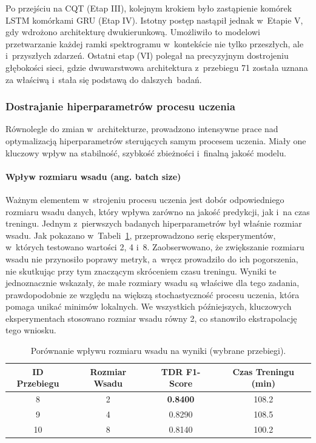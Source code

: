 Po przejściu na CQT (Etap III), kolejnym krokiem było zastąpienie komórek LSTM komórkami GRU (Etap IV). Istotny postęp nastąpił jednak w~Etapie V, gdy wdrożono architekturę dwukierunkową. Umożliwiło to modelowi przetwarzanie każdej ramki spektrogramu w~kontekście nie tylko przeszłych, ale i~przyszłych zdarzeń. Ostatni etap (VI) polegał na precyzyjnym dostrojeniu głębokości sieci, gdzie dwuwarstwowa architektura z~przebiegu 71 została uznana za właściwą i~stała się podstawą do dalszych~badań.

\subsubsection{Dostrajanie hiperparametrów procesu uczenia}
\label{sssec:dostrajanie_hiperparametrow}

Równolegle do zmian w~architekturze, prowadzono intensywne prace nad optymalizacją hiperparametrów sterujących samym procesem uczenia. Miały one kluczowy wpływ na stabilność, szybkość zbieżności i~finalną jakość modelu.

\paragraph{Wpływ rozmiaru wsadu (ang. batch size)}
Ważnym elementem w~strojeniu procesu uczenia jest dobór odpowiedniego rozmiaru wsadu danych, który wpływa zarówno na jakość predykcji, jak i~na czas treningu. Jednym z~pierwszych badanych hiperparametrów był właśnie rozmiar wsadu. Jak pokazano w~Tabeli~\ref{tab:wplyw_batch_size}, przeprowadzono serię eksperymentów, w~których testowano wartości 2, 4 i~8. Zaobserwowano, że zwiększanie rozmiaru wsadu nie przynosiło poprawy metryk, a~wręcz prowadziło do ich pogorszenia, nie skutkując przy tym znaczącym skróceniem czasu treningu. Wyniki te jednoznacznie wskazały, że małe rozmiary wsadu są właściwe dla tego zadania, prawdopodobnie ze względu na większą stochastyczność procesu uczenia, która pomaga unikać minimów lokalnych. We wszystkich późniejszych, kluczowych eksperymentach stosowano rozmiar wsadu równy 2, co stanowiło ekstrapolację tego wniosku.

\begin{table}[H]
\centering
\caption{Porównanie wpływu rozmiaru wsadu na wyniki (wybrane przebiegi).}
\label{tab:wplyw_batch_size}
\begin{tabular}{|c|c|c|c|}
\hline
\textbf{ID Przebiegu} & \textbf{Rozmiar Wsadu} & \textbf{TDR F1-Score } & \textbf{Czas Treningu (min)} \\ \hline
8 & 2 & \textbf{0.8400} & 108.2 \\ \hline
9 & 4 & 0.8290 & 108.5 \\ \hline
10 & 8 & 0.8140 & 100.2 \\ \hline
\end{tabular}
\end{table}

